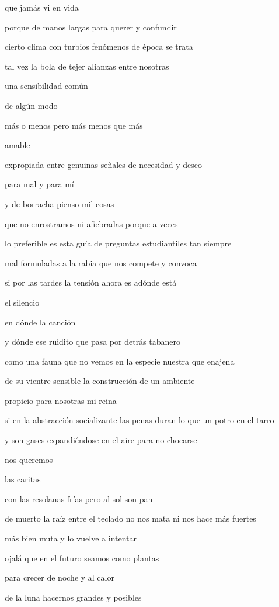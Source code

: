 \documentclass[
]{book}
\begin{document}
que jamás vi en vida

porque de manos largas para querer y confundir

cierto clima con turbios fenómenos de época se trata

tal vez la bola de tejer alianzas entre nosotras

una sensibilidad común

de algún modo

más o menos pero más menos que más

amable

expropiada entre genuinas señales de necesidad y deseo

para mal y para mí

y de borracha pienso mil cosas

que no enrostramos ni afiebradas porque a veces

lo preferible es esta guía de preguntas estudiantiles tan siempre

mal formuladas a la rabia que nos compete y convoca

si por las tardes la tensión ahora es adónde está

el silencio

en dónde la canción

y dónde ese ruidito que pasa por detrás tabanero

como una fauna que no vemos en la especie nuestra que enajena

de su vientre sensible la construcción de un ambiente

propicio para nosotras mi reina

si en la abstracción socializante las penas duran lo que un potro en el tarro

y son gases expandiéndose en el aire para no chocarse

nos queremos

las caritas

con las resolanas frías pero al sol son pan

de muerto la raíz entre el teclado no nos mata ni nos hace más fuertes

más bien muta y lo vuelve a intentar

ojalá que en el futuro seamos como plantas

para crecer de noche y al calor

de la luna hacernos grandes y posibles
\end{document}
